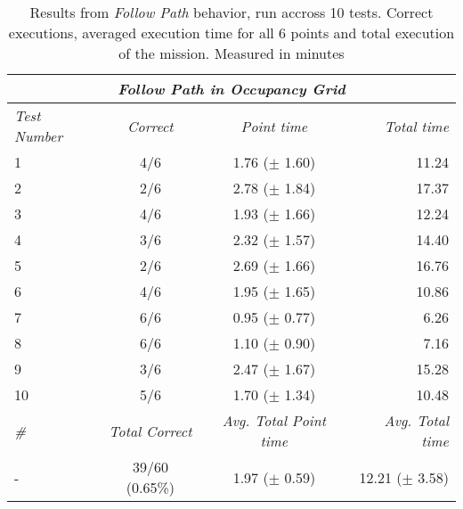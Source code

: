\begin{table}[!h]
  \centering
  \begin{tabular}{lccr} \toprule
    \multicolumn{4}{c}{\textit{Follow Path in Occupancy Grid}}                        \\ \midrule
    \textit{Test Number} & \textit{Correct} & \textit{Point time} & \textit{Total time} \\ \midrule
      1 & 4/6 & 1.76 ($\pm$ 1.60) & 11.24 \\ \hline
      2 & 2/6 & 2.78 ($\pm$ 1.84) & 17.37 \\ \hline
      3 & 4/6 & 1.93 ($\pm$ 1.66) & 12.24 \\ \hline
      4 & 3/6 & 2.32 ($\pm$ 1.57) & 14.40 \\ \hline
      5 & 2/6 & 2.69 ($\pm$ 1.66) & 16.76 \\ \hline
      6 & 4/6 & 1.95 ($\pm$ 1.65) & 10.86 \\ \hline
      7 & 6/6 & 0.95 ($\pm$ 0.77) & 6.26 \\ \hline
      8 & 6/6 & 1.10 ($\pm$ 0.90) & 7.16 \\ \hline
      9 & 3/6 & 2.47 ($\pm$ 1.67) & 15.28 \\ \hline
      10 & 5/6 & 1.70 ($\pm$ 1.34) & 10.48 \\ \hline
      \textit{\#} & \textit{Total Correct} & \textit{Avg. Total Point time} & \textit{Avg. Total time} \\ \midrule
      - & 39/60 (0.65\%) & 1.97 ($\pm$ 0.59) & 12.21 ($\pm$ 3.58) \\ \bottomrule
      \hline
  \end{tabular}
  \caption{Results from \textit{Follow Path} behavior, run accross 10 tests. Correct executions, averaged execution time for all 6 points and total execution of the mission. Measured in minutes}
  \label{ch_5:table:follow_path_results}
\end{table}
